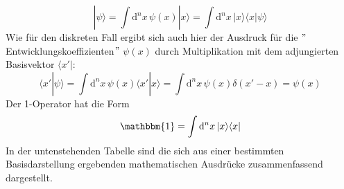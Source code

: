 \documentclass[9pt]{report}
\begin{document}
\begin{equation}
|\psi\rangle=\int\mathrm{d}^{n}x\,\psi(x)|x\rangle=\int\mathrm{d}^{n}x\,|x\rangle\langle x|\psi\rangle
\end{equation}
Wie für den diskreten Fall ergibt sich auch hier der Ausdruck für die $"$Entwicklungskoeffizienten$"$ $\psi(x)$ durch Multiplikation mit dem adjungierten Basisvektor $\langle x'|$:
\begin{equation}
\langle x'|\psi\rangle=\int\mathrm{d}^{n}x\,\psi(x)\langle x'|x\rangle=\int\mathrm{d}^{n}x\,\psi(x)\delta(x'-x)=\psi(x)
\end{equation}
Der 1-Operator hat die Form
\begin{equation}
\mathbbm{1}=\int\mathrm{d}^{n}x\,|x\rangle\langle x|
\end{equation}
In der untenstehenden Tabelle sind die sich aus einer bestimmten Basisdarstellung ergebenden mathematischen Ausdrücke zusammenfassend dargestellt.
\end{document}
